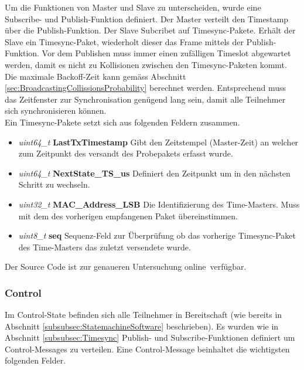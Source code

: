 Um die Funktionen von Master und Slave zu unterscheiden, wurde eine Subscribe- und Publish-Funktion definiert. Der Master verteilt den Timestamp über die Publish-Funktion. Der Slave Subcribet auf Timesync-Pakete. Erhält der Slave ein Timesync-Paket, wiederholt dieser das Frame mittels der Publish-Funktion. Vor dem Publishen muss immer einen zufälligen Timeslot abgewartet werden, damit es nicht zu Kollisionen zwischen den Timesync-Paketen kommt. Die maximale Backoff-Zeit kann gemäss Abschnitt \ref{sec:BroadcastingCollissionsProbability} berechnet werden. Entsprechend muss das Zeitfenster zur Synchronisation genügend lang sein, damit alle Teilnehmer sich synchronisieren können.\\

Ein Timesync-Pakete setzt sich aus folgenden Feldern zusammen. 

\begin{itemize}
	\item \textit{uint64\_t} \textbf{LastTxTimestamp} Gibt den Zeitstempel (Master-Zeit) an welcher zum Zeitpunkt des versandt des Probepakets erfasst wurde. \\
	\item \textit{uint64\_t} \textbf{NextState\_TS\_us} Definiert den Zeitpunkt um in den nächsten Schritt zu wechseln.\\
	\item \textit{uint32\_t} \textbf{MAC\_Address\_LSB} Die Identifizierung des Time-Masters. Muss mit dem des vorherigen empfangenen Paket übereinstimmen. \\
	\item \textit{uint8\_t} \textbf{seq} Sequenz-Feld zur Überprüfung ob das vorherige Timesync-Paket des Time-Masters das zuletzt versendete wurde. \\
\end{itemize}

Der Source Code ist zur genaueren Untersuchung online\footnotemark\ verfügbar. 


\subsubsection{Control}\label{subsubsec:Control}

Im Control-State befinden sich alle Teilnehmer in Bereitschaft (wie bereits in Abschnitt \ref{subsubsec:StatemachineSoftware} beschrieben). Es wurden wie in Abschnitt \ref{subsubsec:Timesync} Publish- und Subscribe-Funktionen definiert um Control-Messages zu verteilen. Eine Control-Message beinhaltet die wichtigsten folgenden Felder.

